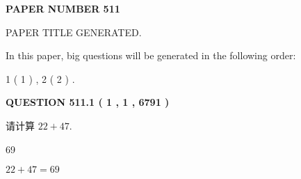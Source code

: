 \documentclass{ctexart}
\begin{document}
   
   
   
\newpage 
\setcounter{page}{ 
   511001 } 
   
   
   
   
 {\textbf{ \Large{ PAPER NUMBER  511  }}}
   
   
\vspace{0.2in}
   
   
   
   
   
   
   
   
 \vspace{0.2in}
 
 
 
 
   
   
 PAPER TITLE GENERATED.
   
   
   
\vspace{0.2in}
   
In this paper, big questions will be generated in the following order: 
   
   
   1 ( 1 )
 ,
   2 ( 2 )
 .
  
\vspace{0.2in}
  
{\textbf{\Large{QUESTION
511.1 
 ( 1 , 1 , 6791 )
}}}
  
  
 
请计算 $ %
22 +  %
47 $.
 
 
 
\noindent{}
 
 

69
 
 
\noindent{}
 
 

 
 
 
\noindent{}
 
 

$ %
22 +  %
47=   %
69$
 
 
\noindent{}
 
 

 
   
   
   
\end{document}
